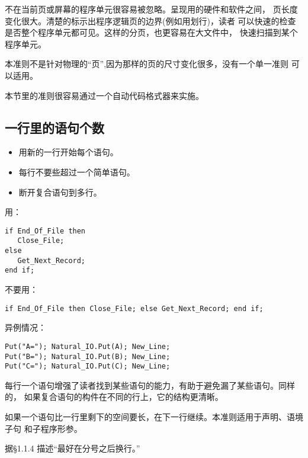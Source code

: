 \begin{blockindent}
不在当前页或屏幕的程序单元很容易被忽略。呈现用的硬件和软件之间，
页长度变化很大。清楚的标示出程序逻辑页的边界(例如用划行)，读者
可以快速的检查是否整个程序单元都可见。这样的分页，也更容易在大文件中，
快速扫描到某个程序单元。
\end{blockindent}

\begin{blockindent}
本准则不是针对物理的``页'',因为那样的页的尺寸变化很多，没有一个单一准则
可以适用。
\end{blockindent}

\begin{blockindent}
本节里的准则很容易通过一个自动代码格式器来实施。
\end{blockindent}

\subsection{一行里的语句个数}
\begin{itemize}
    \item 用新的一行开始每个语句。
    \item 每行不要些超过一个简单语句。
    \item 断开复合语句到多行。
\end{itemize}

\begin{blockindent}
用：
\begin{lstlisting}
if End_Of_File then
   Close_File;
else
   Get_Next_Record;
end if;
\end{lstlisting}
不要用：
\begin{lstlisting}
if End_Of_File then Close_File; else Get_Next_Record; end if;
\end{lstlisting}
异例情况：
\begin{lstlisting}
Put("A="); Natural_IO.Put(A); New_Line;
Put("B="); Natural_IO.Put(B); New_Line;
Put("C="); Natural_IO.Put(C); New_Line;
\end{lstlisting}
\end{blockindent}

\begin{blockindent}
每行一个语句增强了读者找到某些语句的能力，有助于避免漏了某些语句。同样的，
如果复合语句的构件在不同的行上，它的结构更清晰。
\end{blockindent}

\begin{blockindent}
如果一个语句比一行里剩下的空间要长，在下一行继续。本准则适用于声明、语境子句
和子程序形参。

据\cite{arm95}\S{}1.1.4 描述``最好在分号之后换行。''
\end{blockindent}

